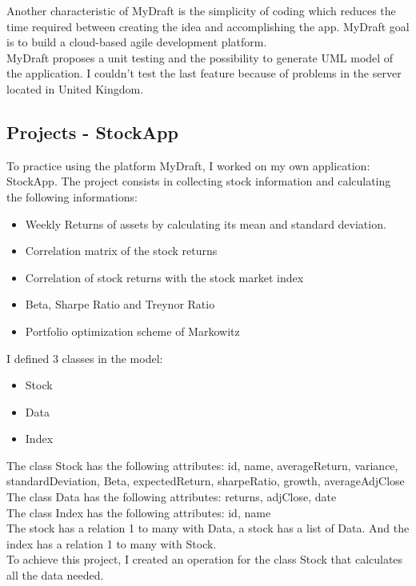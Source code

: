 \documentclass{report}
\begin{document}
Another characteristic of MyDraft is the simplicity of coding which reduces the time required between creating the idea and accomplishing the app. MyDraft goal is to build a cloud-based agile development platform.\\

MyDraft proposes a unit testing and the possibility to generate UML model of the application. I couldn't test the last feature because of problems in the server located in United Kingdom.\\

\subsection{Projects - StockApp}
To practice using the platform MyDraft, I worked on my own application: StockApp. The project consists in collecting stock information and calculating the following informations: 
\begin{itemize}
\item Weekly Returns of assets by calculating its mean and standard deviation. 
\item Correlation matrix of the stock returns
\item Correlation of stock returns with the stock market index
\item Beta, Sharpe Ratio and Treynor Ratio
\item Portfolio optimization scheme of Markowitz
\end{itemize}
I defined 3 classes in the model: 
\begin{itemize}
\item Stock
\item Data
\item Index
\end{itemize}
The class Stock has the following attributes: id, name, averageReturn, variance, standardDeviation, Beta, expectedReturn, sharpeRatio, growth, averageAdjClose\\
The class Data has the following attributes: returns, adjClose, date \\
The class Index has the following attributes: id, name\\
The stock has a relation 1 to many with Data, a stock has a list of Data. And the index has a relation 1 to many with Stock. \\
To achieve this project, I created an operation for the class Stock that calculates all the data needed.\\
\end{document}
